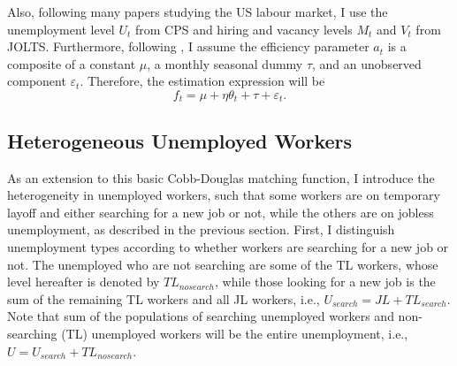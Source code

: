 \documentclass[a4paper, 11pt, tikz]{article}
\begin{document}
Also, following many papers studying the US labour market, I use the unemployment level $U_t$ from CPS and hiring and vacancy levels $M_t$ and $V_t$ from JOLTS.
Furthermore, following \cite{borowczyk-martins2013accounting}, I assume the efficiency parameter $a_t$ is a composite of a constant $\mu$, a monthly seasonal dummy $\tau$, and an unobserved component $\varepsilon_t$.
Therefore, the estimation expression will be
\begin{equation}\label{matching_function_formula}
  f_t = \mu + \eta\theta_t + \tau + \varepsilon_t.
\end{equation}

\subsection{Heterogeneous Unemployed Workers}
As an extension to this basic Cobb-Douglas matching function, I introduce the heterogeneity in unemployed workers, such that some workers are on temporary layoff and either searching for a new job or not, while the others are on jobless unemployment, as described in the previous section.
First, I distinguish unemployment types according to whether workers are searching for a new job or not.
The unemployed who are not searching are some of the TL workers, whose level hereafter is denoted by $TL_{nosearch}$, while those looking for a new job is the sum of the remaining TL workers and all JL workers, i.e., $U_{search} = JL + TL_{search}$.
Note that sum of the populations of searching unemployed workers and non-searching (TL) unemployed workers will be the entire unemployment, i.e., $U = U_{search} + TL_{nosearch}$.
\end{document}
